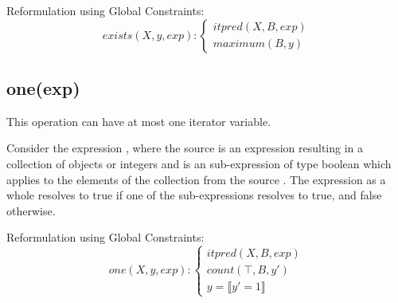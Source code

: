 Reformulation using Global Constraints:
\begin{equation}\label{csp:exists}
    exists(X,y,exp):
    \begin{cases}
        itpred(X,B,exp)\\
        maximum(B,y)
    \end{cases}
\end{equation}


\subsection{one(exp)}
This operation can have at most one iterator variable.

Consider the expression , where the source  is an expression resulting in a collection of objects or integers and  is an sub-expression of type boolean which applies to the elements of the collection from the source .
The expression as a whole resolves to true if one of the sub-expressions resolves to true, and false otherwise.

Reformulation using Global Constraints:
\begin{equation}\label{csp:one}
    one(X,y,exp):
    \begin{cases}
        itpred(X,B,exp)\\
        count(\top,B,y')\\
        y = \llbracket y' = 1 \rrbracket
    \end{cases}
\end{equation}

